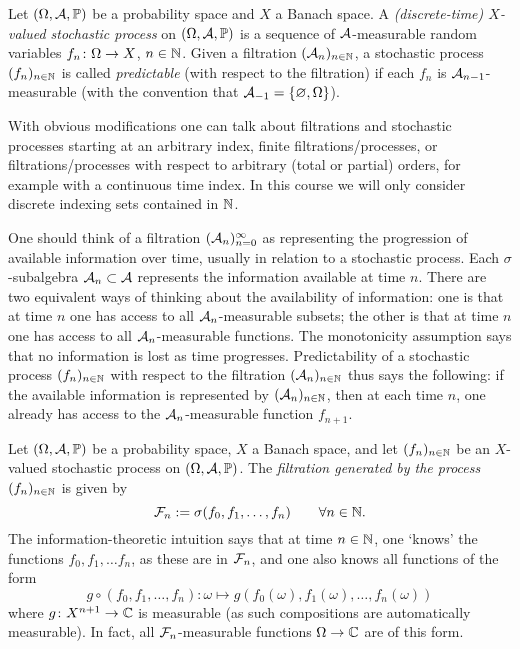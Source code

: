 \begin{defn}
  Let $(\Omega,\mathcal{A},\mathbb{P})$ be a probability space and $X$ a Banach space.
  A \emph{(discrete-time) $X$-valued stochastic process} on $(\Omega,\mathcal{A},\mathbb{P})$ is a sequence of $\mathcal{A}$-measurable random variables $f_n \colon \Omega \rightarrow X$, $n \in \mathbb{N}$.
  Given a filtration $(\mathcal{A}_n)_{n \in \mathbb{N}}$, a stochastic process $(f_n)_{n \in \mathbb{N}}$ is called \emph{predictable} (with respect to the filtration) if each $f_n$ is $\mathcal{A}_{n-1}$-measurable (with the convention that $\mathcal{A}_{-1} = \{\varnothing, \Omega\}$).
\end{defn}

\begin{rmk}
  With obvious modifications one can talk about filtrations and stochastic processes starting at an arbitrary index, finite filtrations/processes, or filtrations/processes with respect to arbitrary (total or partial) orders, for example with a continuous time index.
  In this course we will only consider discrete indexing sets contained in $\mathbb{N}$.
\end{rmk}

One should think of a filtration $(\mathcal{A}_n)_{n=0}^\infty$ as representing the progression of available information over time, usually in relation to a stochastic process.
Each $\sigma$-subalgebra $\mathcal{A}_n \subset \mathcal{A}$ represents the information available at time $n$.
There are two equivalent ways of thinking about the availability of information: one is that at time $n$ one has access to all $\mathcal{A}_n$-measurable subsets; the other is that at time $n$ one has access to all $\mathcal{A}_n$-measurable functions.
The monotonicity assumption says that no information is lost as time progresses.
Predictability of a stochastic process $(f_n)_{n \in \mathbb{N}}$ with respect to the filtration $(\mathcal{A}_n)_{n \in \mathbb{N}}$ thus says the following: if the available information is represented by $(\mathcal{A}_n)_{n \in \mathbb{N}}$, then at each time $n$, one already has access to the $\mathcal{A}_n$-measurable function $f_{n+1}$.

\begin{example}\label{eg:filtration-generated-by-process}
  Let $(\Omega,\mathcal{A},\mathbb{P})$ be a probability space, $X$ a Banach space, and let $(f_n)_{n \in \mathbb{N}}$ be an $X$-valued stochastic process on $(\Omega,\mathcal{A},\mathbb{P})$.
  The \emph{filtration generated by the process $(f_n)_{n \in \mathbb{N}}$} is given by
  \begin{equation*}
    \mathcal{F}_n := \sigma(f_0,f_1,\ldots,f_n) \qquad \forall n \in \mathbb{N}.
  \end{equation*}
  The information-theoretic intuition says that at time $n \in \mathbb{N}$, one `knows' the functions $f_0, f_1, \ldots f_n$, as these are in $\mathcal{F}_n$, and one also knows all functions of the form
  \begin{equation*}
    g \circ (f_0, f_1, \ldots, f_n) \colon \omega \mapsto g(f_0(\omega),f_1(\omega),\ldots,f_n(\omega))
  \end{equation*}
  where $g \colon X^{n+1} \rightarrow \mathbb{C}$ is measurable (as such compositions are automatically measurable).
  In fact, all $\mathcal{F}_n$-measurable functions $\Omega \to \mathbb{C}$ are of this form.
\end{example}

